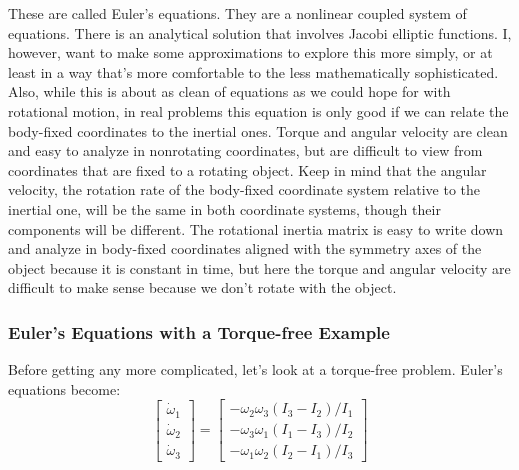\documentclass[10pt]{article}
\begin{document}
These are called Euler's equations. They are a nonlinear coupled 
system of equations. There is an analytical solution that involves 
Jacobi elliptic functions. I, however, want to make some approximations 
to explore this more simply, or at least in a way that's more comfortable 
to the less mathematically sophisticated. Also, while 
this is about as clean of equations as we could hope for 
with rotational motion, in real problems this equation is only good if 
we can relate the body-fixed coordinates to the inertial ones. Torque and 
angular velocity are clean and easy to analyze in nonrotating coordinates, but 
are difficult to view from coordinates that are fixed to a rotating object. 
Keep in mind that the angular velocity, the rotation rate of the body-fixed 
coordinate system relative to the inertial one, will be the same in both 
coordinate systems, though their components will be different.
The rotational inertia matrix is easy to write down and analyze in body-fixed 
coordinates aligned with the symmetry axes of the object because it is constant
in time, but here the torque and angular velocity are difficult to make sense 
because we don't rotate with the object.

\subsubsection{Euler's Equations with a Torque-free Example}

Before getting any more complicated, let's look at a torque-free problem. 
Euler's equations become:
\begin{equation}
    \begin{bmatrix}
        \dot{\omega}_1 \\
        \dot{\omega}_2 \\
        \dot{\omega}_3
    \end{bmatrix}
        =
        \begin{bmatrix}
            -\omega_2\omega_3(I_3 - I_2)/I_1 \\
            -\omega_3\omega_1(I_1 - I_3)/I_2 \\
            -\omega_1\omega_2(I_2 - I_1)/I_3
        \end{bmatrix}
\end{equation}
\end{document}
